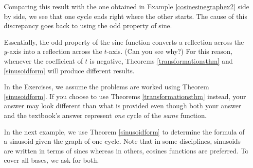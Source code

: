 \documentclass{ximera}
\begin{document}
\begin{tabular}{m{2in}m{1.5in}m{1.5in}}
\end{tabular}

\smallskip

Comparing this result with the one obtained in Example \ref{cosinesinegraphex2} side by side, we see that one cycle ends right where the other starts.  The cause of this discrepancy goes back to using the odd property of sine. 

\smallskip

 Essentially, the odd property of the sine function  converts a reflection across the $y$-axis into a reflection across the $t$-axis. (Can you see why?)  For this reason, whenever the coefficient of $t$ is negative, Theorems \ref{transformationsthm} and  \ref{sinusoidform} will produce different results.  
 
 \smallskip
 
 In the Exercises, we assume the problems are worked using Theorem \ref{sinusoidform}.  If you choose to use Theorems \ref{transformationsthm} instead, your answer may look different than what is provided even though both your answer and the textbook's answer represent \textit{one} cycle of the \textit{same} function.  

\smallskip

In the next example,  we use Theorem \ref{sinusoidform} to determine the formula of a sinusoid given the graph of one cycle.  Note that in some disciplines, sinusoids are written in terms of sines whereas in others,   cosines functions are preferred.  To cover all bases,  we ask for both.
\end{document}

